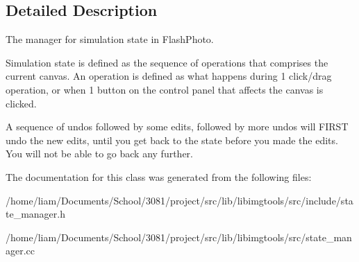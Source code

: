 \subsection{Detailed Description}
The manager for simulation state in Flash\+Photo. 

Simulation state is defined as the sequence of operations that comprises the current canvas. An operation is defined as what happens during 1 click/drag operation, or when 1 button on the control panel that affects the canvas is clicked.

A sequence of undos followed by some edits, followed by more undos will F\+I\+R\+ST undo the new edits, until you get back to the state before you made the edits. You will not be able to go back any further. 

The documentation for this class was generated from the following files\+:\begin{DoxyCompactItemize}
\item 
/home/liam/\+Documents/\+School/3081/project/src/lib/libimgtools/src/include/state\+\_\+manager.\+h\item 
/home/liam/\+Documents/\+School/3081/project/src/lib/libimgtools/src/state\+\_\+manager.\+cc\end{DoxyCompactItemize}

